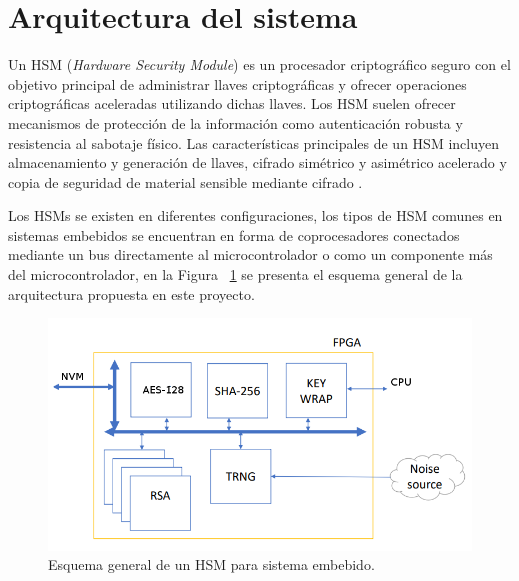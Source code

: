 \documentclass[a4paper]{article}
\begin{document}
\section{Arquitectura del sistema}

Un HSM (\textit{Hardware Security Module}) es un procesador criptográfico seguro con el objetivo principal de administrar llaves criptográficas y ofrecer operaciones criptográficas aceleradas utilizando dichas llaves. Los HSM suelen ofrecer mecanismos de protección de la información como autenticación robusta y resistencia al sabotaje físico. Las características principales de un HSM incluyen almacenamiento y generación de llaves, cifrado simétrico y asimétrico acelerado y copia de seguridad de material sensible mediante cifrado \cite{mtreviewhsm:2010}. 

Los HSMs se existen en diferentes configuraciones, los tipos de HSM comunes en sistemas embebidos se encuentran en forma de coprocesadores conectados mediante un bus directamente al microcontrolador o como un componente más del microcontrolador, en la Figura  ~\ref{fig:hsm_general} se presenta el esquema general de la arquitectura propuesta en este proyecto.
 
\begin{figure}[h]
  \centering
  \includegraphics[scale=0.5]{pictures/hsm_architecture.png}
  \caption{Esquema general de un HSM para sistema embebido.}
  \label{fig:hsm_general}
\end{figure}
\end{document}
